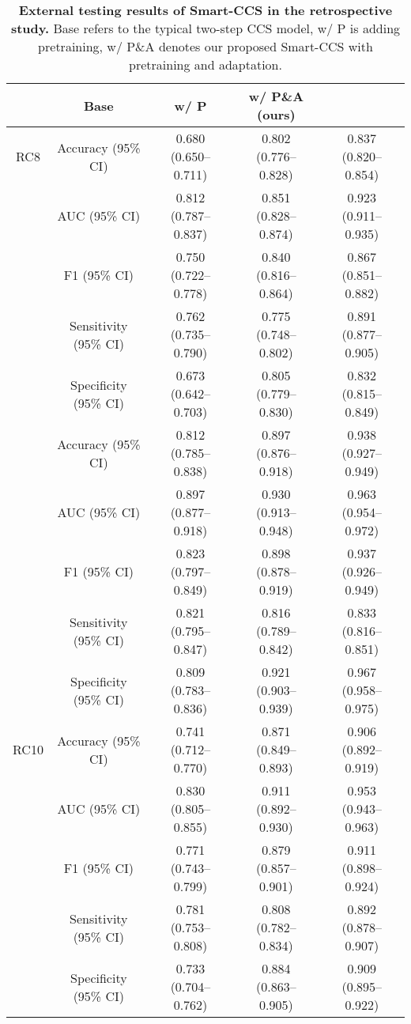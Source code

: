\begin{table}[h]
\begin{tabular}{cc|c|c}
\hline 
\end{tabular} 
\label{ST_wsi_3}
\end{table}


\clearpage
\begin{table}[h] 
\renewcommand{\arraystretch}{2}
\renewcommand{\tablename}{Extended Data Table.}
\centering 
\caption{\textbf{External testing results of Smart-CCS in the retrospective study.} Base refers to the typical two-step CCS model, w/ P is adding pretraining, w/ P\&A denotes our proposed Smart-CCS with pretraining and adaptation.}
\begin{tabular}{cc|ccc} 
\hline
 \rowcolor{cusyellow} \multicolumn{2}{c|}{\multirow{1}{*}{\textbf{Metrics}}} & \textbf{Base} &\textbf{w/ P }&\textbf{w/ P\&A (ours)}\\ 
\hline
\multirow{1}{*}{RC8}&Accuracy (95\% CI) & 0.680 (0.650–0.711)&0.802 (0.776–0.828)&0.837 (0.820–0.854)\\
& AUC (95\% CI) &0.812 (0.787–0.837) & 0.851 (0.828–0.874)& 0.923 (0.911–0.935)\\
& F1 (95\% CI) &0.750 (0.722–0.778)&0.840 (0.816–0.864) &0.867 (0.851–0.882)\\
& Sensitivity (95\% CI) &0.762 (0.735–0.790)& 0.775 (0.748–0.802) & 0.891 (0.877–0.905)\\
& Specificity (95\% CI) &0.673 (0.642–0.703)& 0.805 (0.779–0.830)&0.832 (0.815–0.849)\\




 \rowcolor{cusyellowl}  \multirow{1}{*}{RC9}&Accuracy (95\% CI) & 0.812 (0.785–0.838)&0.897 (0.876–0.918)&0.938 (0.927–0.949)\\
 \rowcolor{cusyellowl} & AUC (95\% CI) &0.897 (0.877–0.918) &0.930 (0.913–0.948)&0.963 (0.954–0.972)\\
 \rowcolor{cusyellowl} & F1 (95\% CI) & 0.823 (0.797–0.849) &0.898 (0.878–0.919)&0.937 (0.926–0.949) \\
 \rowcolor{cusyellowl} & Sensitivity (95\% CI) & 0.821 (0.795–0.847) &0.816 (0.789–0.842) &0.833 (0.816–0.851)\\
 \rowcolor{cusyellowl} & Specificity (95\% CI) & 0.809 (0.783–0.836)&0.921 (0.903–0.939) &0.967 (0.958–0.975)\\




\multirow{1}{*}{RC10}&Accuracy (95\% CI) &0.741 (0.712–0.770) &0.871 (0.849–0.893) &0.906 (0.892–0.919)\\
& AUC (95\% CI) &0.830 (0.805–0.855)&0.911 (0.892–0.930) &0.953 (0.943–0.963)\\
& F1 (95\% CI) &0.771 (0.743–0.799)& 0.879 (0.857–0.901)& 0.911 (0.898–0.924)\\
& Sensitivity (95\% CI) &0.781 (0.753–0.808)& 0.808 (0.782–0.834) &0.892 (0.878–0.907) \\
& Specificity (95\% CI) &0.733 (0.704–0.762)&0.884 (0.863–0.905)& 0.909 (0.895–0.922) \\




\end{tabular}
\end{table}
